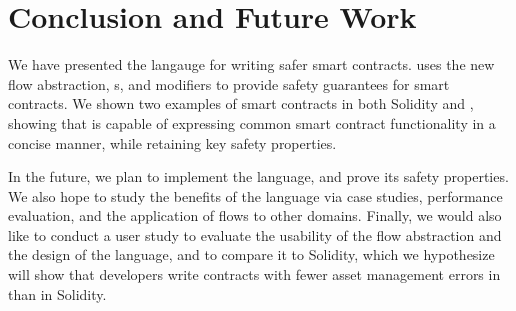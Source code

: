 \documentclass[dvipsnames,runningheads]{llncs}
\begin{document}
\section{Conclusion and Future Work}

We have presented the \langName langauge for writing safer smart contracts.
\langName uses the new flow abstraction, \assetTxt{}s, and modifiers to provide safety guarantees for smart contracts.
We shown two examples of smart contracts in both Solidity and \langName, showing that \langName is capable of expressing common smart contract functionality in a concise manner, while retaining key safety properties.

In the future, we plan to implement the \langName language, and prove its safety properties.
We also hope to study the benefits of the language via case studies, performance evaluation, and the application of flows to other domains.
Finally, we would also like to conduct a user study to evaluate the usability of the flow abstraction and the design of the language, and to compare it to Solidity, which we hypothesize will show that developers write contracts with fewer asset management errors in \langName than in Solidity.



\end{document}
